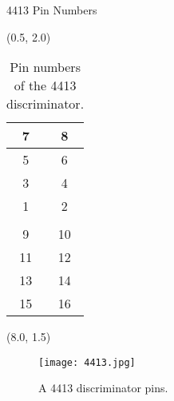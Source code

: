 \documentclass[10pt, xcolor={dvipsnames}, aspectratio = 169, sans,mathserif]{beamer}
\begin{document}
\begin{frame}{4413 Pin Numbers}

\begin{textblock}{7.0}(0.5, 2.0)
\begin{table}
\begin{center}
\begin{tabular}{ | c | c |}
\hline
7 & 8 \\
\hline
5 & 6 \\
\hline
3 & 4 \\
\hline
1 & 2 \\
\hline
 & \\
\hline
9 & 10 \\
\hline
11 & 12 \\
\hline
13 & 14 \\
\hline
15 & 16 \\
\hline
\end{tabular}
\caption{Pin numbers of the 4413 discriminator.}
\end{center}
\end{table}
\end{textblock}

\begin{textblock}{7.0}(8.0, 1.5)
\begin{figure}
    \centering
    \texttt{[image: 4413.jpg]}
    \caption{A 4413 discriminator pins.}
\end{figure}
\end{textblock}

\end{frame}
\end{document}
